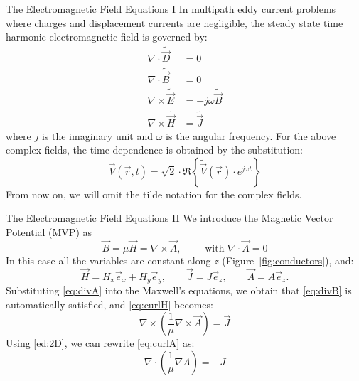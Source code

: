 \documentclass[aspectratio=54,xcolor=dvipsnames]{beamer}
\begin{document}
\begin{frame}{The Electromagnetic Field Equations I}
    In multipath eddy current problems where charges and displacement currents are negligible, the steady state time harmonic electromagnetic field is governed by:
    \begin{align}
        \nabla \cdot \tilde{\vec{D}} &= 0 \label{eq:divD} \\
        \nabla \cdot \tilde{\vec{B}} &= 0 \label{eq:divB} \\
        \nabla \times \tilde{\vec{E}} &= - j \omega \tilde{\vec{B}} \label{eq:curlE} \\
        \nabla \times \tilde{\vec{H}} &= \tilde{\vec{J}} \label{eq:curlH}
    \end{align}
    where $j$ is the imaginary unit and $\omega$ is the angular frequency. For the above complex fields, the time dependence is obtained by the substitution:
    \begin{equation*}
        \vec{V}(\vec{r}, t) = \sqrt{2} \cdot \Re \left\{ \tilde{\vec{V}}(\vec{r}) \cdot e^{j \omega t} \right\}
    \end{equation*}
    From now on, we will omit the tilde notation for the complex fields.
\end{frame}

\begin{frame}{The Electromagnetic Field Equations II}
    We introduce the Magnetic Vector Potential (MVP) as
    \begin{equation}
        \vec{B} = \mu \vec{H} = \nabla \times \vec{A}, \qquad \text{ with } \nabla \cdot \vec{A} = 0 \label{eq:divA}
    \end{equation}
    In this case all the variables are constant along $z$ (Figure~\ref{fig:conductors}), and:
    \begin{equation}
        \vec{H} = H_x \vec{e}_x + H_y \vec{e}_y, \qquad
        \vec{J} = J \vec{e}_z, \qquad
        \vec{A} = A \vec{e}_z. \label{ed:2D}
    \end{equation}
    Substituting \eqref{eq:divA} into the Maxwell's equations, we obtain that \eqref{eq:divB} is automatically satisfied, and \eqref{eq:curlH} becomes:
    \begin{equation}
        \nabla \times \left( \frac{1}{\mu} \nabla \times \vec{A} \right) = \vec{J}\label{eq:curlA}
    \end{equation}
    Using \eqref{ed:2D}, we can rewrite \eqref{eq:curlA} as:
    \begin{equation}
        \nabla \cdot \left( \frac{1}{\mu} \nabla A \right) = -J \label{eq:laplacianA}
    \end{equation}
\end{frame}
\end{document}
